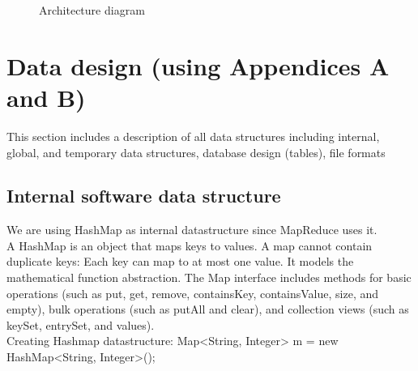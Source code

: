 \documentclass[oneside,a4paper,12pt]{report}
\begin{document}
  \begin{center}
	\begin{figure}[!htbp]
		\centering
	  \caption{Architecture diagram}
	  \label{fig:arch-dig}
	\end{figure}
\end{center} 


\section{Data design (using Appendices A and B)}   
This section includes a description of all data structures including internal, global, and temporary data structures, database design (tables), file formats

\subsection{Internal software data structure}
We are using HashMap as internal datastructure since MapReduce uses it. \\
A HashMap is an object that maps keys to values. A map cannot contain duplicate keys: Each key can map to at most one value. It models the mathematical function abstraction. The Map interface includes methods for basic operations (such as put, get, remove, containsKey, containsValue, size, and empty), bulk operations (such as putAll and clear), and collection views (such as keySet, entrySet, and values). \\
Creating Hashmap datastructure: Map<String, Integer> m = new HashMap<String, Integer>(); \\ \\
     
\end{document}
